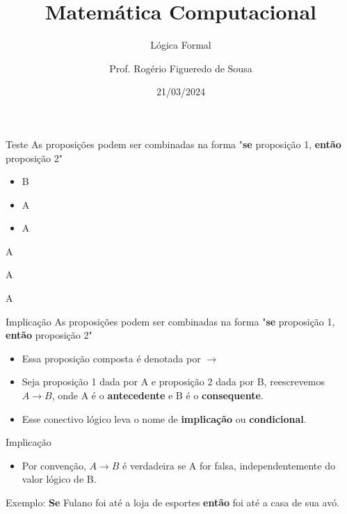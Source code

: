 \documentclass[aspectratio=169]{beamer}
\title{Matemática Computacional}
\subtitle{Lógica Formal}
\author{Prof. Rogério Figueredo de Sousa}
\institute{%
\href{rogerio.sousa@ifpi.edu.br}{rogerio.sousa@ifpi.edu.br}%
}%
\date{21/03/2024}
\begin{document}
\begin{frame}[plain]
    \titlepage
\end{frame}




\jsonp
{}

\begin{frame}{Teste}
    As proposições podem ser combinadas na forma "\textbf{se} proposição 1, \textbf{então} proposição 2"
    \begin{multicols}{2}
            \begin{itemize}
                \item[\ding{32}] B
                \item A
                \item A
            \end{itemize}
        \columnbreak
        A

        A

        A
    \end{multicols}

\end{frame}
\begin{frame}{Implicação}
    As proposições podem ser combinadas na forma "\textbf{se} proposição 1, \textbf{então} proposição 2"
    \begin{itemize}
        \item Essa proposição composta é denotada por $\rightarrow$
        \item Seja proposição 1 dada por A e proposição 2 dada por B,
              reescrevemos $A \rightarrow B$, onde A é o \textbf{antecedente} e
              B é o \textbf{consequente}.
        \item Esse conectivo lógico leva o nome de \textbf{implicação} ou \textbf{condicional}.
    \end{itemize}
\end{frame}


\begin{frame}{Implicação}
    \begin{itemize}
        \item Por convenção, $A \rightarrow B$ é verdadeira se A for falsa, independentemente do valor lógico de B.
    \end{itemize}

    \vspace{4mm}

    Exemplo: \textbf{Se} Fulano foi até a loja de esportes \textbf{então} foi
    até a casa de sua avó.
\end{frame}
\end{document}
